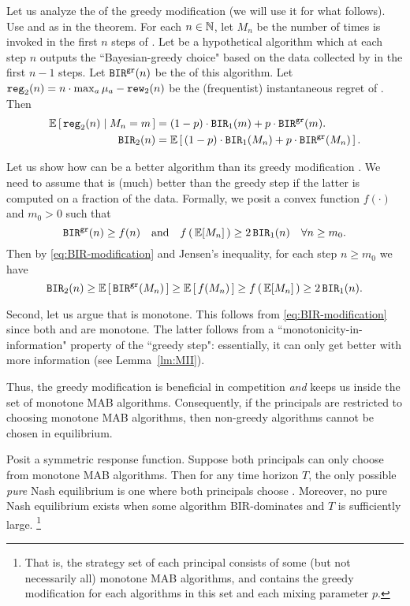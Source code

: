 
Let us analyze the \BIR of the greedy modification (we will use it for what follows). Use \alg[1] and \alg[2] as in the theorem. For each $n\in\mathbb{N}$, let $M_n$ be the number of times \alg[1] is invoked in the first $n$ steps of \alg[2]. Let \alggr be a hypothetical algorithm which at each step $n$ outputs the ``Bayesian-greedy choice" based on the data collected by \alg[1] in the first $n-1$ steps. Let $\mathtt{BIR}^{\texttt{gr}}(n)$ be the \BIR of this algorithm. Let
    $\mathtt{reg}_2(n) = n\cdot \max_a \mu_a - \mathtt{rew}_2(n)$
be the (frequentist) instantaneous regret of \alg[2]. Then
\begin{align}
\E\sbr{ \mathtt{reg}_2(n) \mid M_n = m}
    &= (1-p) \cdot \BIR_1(m) + p \cdot \BIRgr(m). \nonumber \\
\BIR_2(n)
    &= \E\sbr{ (1-p) \cdot \BIR_1(M_n) + p \cdot \BIRgr(M_n) }.
    \label{eq:BIR-modification}
\end{align}

Let us show how \alg[1] can be a better algorithm than its greedy modification \alg[2]. We need to assume that \alg[1] is (much) better than the greedy step \alggr if the latter is computed on a fraction of the data. Formally, we posit a convex function $f(\cdot)$ and $m_0>0$ such that
\[ \BIRgr(n) \geq f(n)
    \quad\text{and}\quad
    f\rbr{\E[M_n]} \geq 2\, \BIR_1(n) \quad \forall n\geq m_0 .  \]
Then by \eqref{eq:BIR-modification} and Jensen's inequality, for each step $n\geq m_0$ we have
\[\BIR_2(n)
    \geq  \E\sbr{ \BIRgr(M_n) }
    \geq \E\sbr{ f(M_n) }
    \geq f\rbr{ \E[M_n] }
    \geq 2\,\BIR_1(n). \]

Second, let us argue that \alg[2] is monotone. This follows from \eqref{eq:BIR-modification} since both \alg[1] and \alggr are monotone. The latter follows from a ``monotonicity-in-information" property of the ``greedy step": essentially, it can only get better with more information
(see Lemma~\ref{lm:MII}).

Thus, the greedy modification is beneficial in competition \emph{and} keeps us inside the set of monotone MAB algorithms. Consequently, if the principals are restricted to choosing monotone MAB algorithms, then non-greedy algorithms cannot be chosen in equilibrium.

\begin{corollary}\label{cor:random-greedy}
Posit a symmetric \HardMaxRandom response function. Suppose both principals can only choose from monotone MAB algorithms. Then for any time horizon $T$, the only possible \emph{pure} Nash equilibrium is one where both principals choose \DynGreedy. Moreover, no pure Nash equilibrium exists when some algorithm BIR-dominates \DynGreedy and $T$ is sufficiently large.
%
\footnote{That is, the strategy set of each principal consists of some (but not necessarily all) monotone MAB algorithms, and contains the greedy modification for each algorithms in this set and each mixing parameter $p$.}
\end{corollary}

